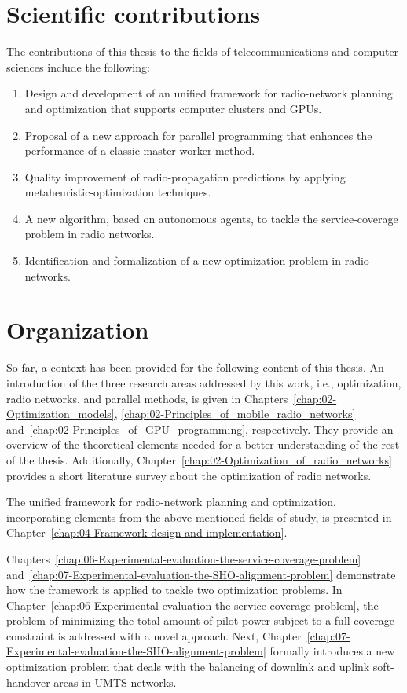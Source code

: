 \section{Scientific contributions}

The contributions of this thesis to the fields of telecommunications
and computer sciences include the following:
\begin{enumerate}
\item Design and development of an unified framework for radio-network planning
and optimization that supports computer clusters and GPUs.
\item Proposal of a new approach for parallel programming that enhances
the performance of a classic master-worker method.
\item Quality improvement of radio-propagation predictions by applying metaheuristic-optimization
techniques.
\item A new algorithm, based on autonomous agents, to tackle the service-coverage
problem in radio networks.
\item Identification and formalization of a new optimization problem in
radio networks.
\end{enumerate}

\section{Organization}

So far, a context has been provided for the following content of this
thesis. An introduction of the three research areas addressed by this
work, i.e., optimization, radio networks, and parallel methods, is
given in Chapters~\ref{chap:02-Optimization_models}, \ref{chap:02-Principles_of_mobile_radio_networks}
and~\ref{chap:02-Principles_of_GPU_programming}, respectively. They
provide an overview of the theoretical elements needed for a better
understanding of the rest of the thesis. Additionally, Chapter~\ref{chap:02-Optimization_of_radio_networks}
provides a short literature survey about the optimization of radio
networks. 

The unified framework for radio-network planning and optimization,
incorporating elements from the above-mentioned fields of study, is
presented in Chapter~\ref{chap:04-Framework-design-and-implementation}.

Chapters~\ref{chap:06-Experimental-evaluation-the-service-coverage-problem}
and~\ref{chap:07-Experimental-evaluation-the-SHO-alignment-problem}
demonstrate how the framework is applied to tackle two optimization
problems. In Chapter~\ref{chap:06-Experimental-evaluation-the-service-coverage-problem},
the problem of minimizing the total amount of pilot power subject
to a full coverage constraint is addressed with a novel approach.
Next, Chapter~\ref{chap:07-Experimental-evaluation-the-SHO-alignment-problem}
formally introduces a new optimization problem that deals with the
balancing of downlink and uplink soft-handover areas in UMTS networks.

